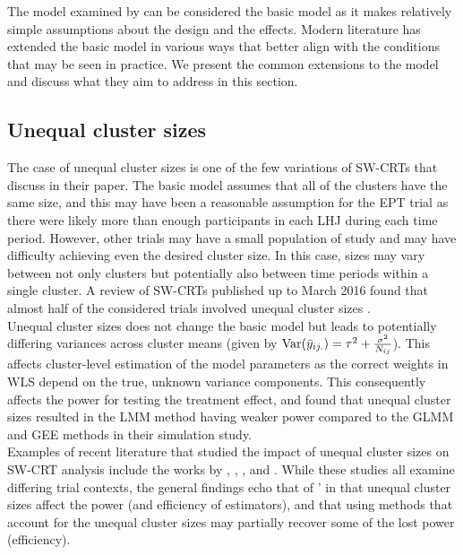 \documentclass[10pt]{article}
\begin{document}
The model examined by \textcite{Hussey:2007} can be considered the basic model as it makes relatively simple assumptions about the design and the effects. Modern literature has extended the basic model in various ways that better align with the conditions that may be seen in practice. We present the common extensions to the model and discuss what they aim to address in this section.

\subsection{Unequal cluster sizes}

The case of unequal cluster sizes is one of the few variations of SW-CRTs that \citeauthor{Hussey:2007} discuss in their paper. The basic model assumes that all of the clusters have the same size, and this may have been a reasonable assumption for the EPT trial as there were likely more than enough participants in each LHJ during each time period. However, other trials may have a small population of study and may have difficulty achieving even the desired cluster size. In this case, sizes may vary between not only clusters but potentially also between time periods within a single cluster. A review of SW-CRTs published up to March 2016 found that almost half of the considered trials involved unequal cluster sizes \parencite{Kristunas:2017}.
\\

Unequal cluster sizes does not change the basic model but leads to potentially differing variances across cluster means (given by $\mathrm{Var}(\bar{y}_{ij.})=\tau^2+\frac{\sigma^2}{N_{ij}}$). This affects cluster-level estimation of the model parameters as the correct weights in WLS depend on the true, unknown variance components. This consequently affects the power for testing the treatment effect, and \textcite{Hussey:2007} found that unequal cluster sizes resulted in the LMM method having weaker power compared to the GLMM and GEE methods in their simulation study.
\\

Examples of recent literature that studied the impact of unequal cluster sizes on SW-CRT analysis include the works by \textcite{Martin:2019}, \textcite{Ouyang:2020}, \textcite{Kasza:2021}, and \textcite{Tian:2021}. While these studies all examine differing trial contexts, the general findings echo that of \citeauthor{Hussey:2007}' in that unequal cluster sizes affect the power (and efficiency of estimators), and that using methods that account for the unequal cluster sizes may partially recover some of the lost power (efficiency).
\end{document}
